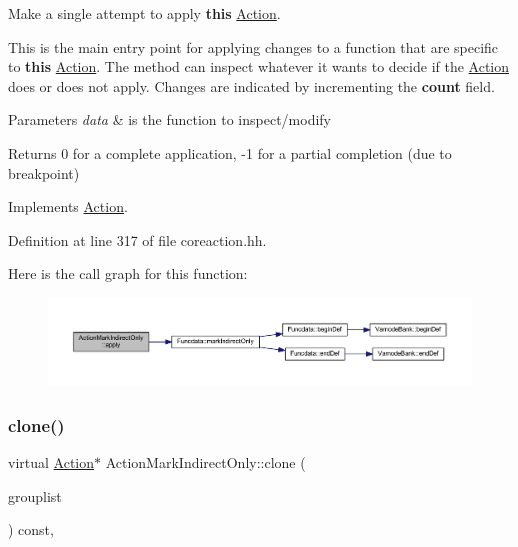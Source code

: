 Make a single attempt to apply {\bfseries{this}} \mbox{\hyperlink{class_action}{Action}}. 

This is the main entry point for applying changes to a function that are specific to {\bfseries{this}} \mbox{\hyperlink{class_action}{Action}}. The method can inspect whatever it wants to decide if the \mbox{\hyperlink{class_action}{Action}} does or does not apply. Changes are indicated by incrementing the {\bfseries{count}} field. 
\begin{DoxyParams}{Parameters}
{\em data} & is the function to inspect/modify \\
\hline
\end{DoxyParams}
\begin{DoxyReturn}{Returns}
0 for a complete application, -\/1 for a partial completion (due to breakpoint) 
\end{DoxyReturn}


Implements \mbox{\hyperlink{class_action_aac1c3999d6c685b15f5d9765a4d04173}{Action}}.



Definition at line 317 of file coreaction.\+hh.

Here is the call graph for this function\+:
\nopagebreak
\begin{figure}[H]
\begin{center}
\leavevmode
\includegraphics[width=350pt]{class_action_mark_indirect_only_aebf60dbaf803f470c8954cab93acc241_cgraph}
\end{center}
\end{figure}
\mbox{\label{class_action_mark_indirect_only_ac53f9107d3a9c5be4576867c9eb8ad01}} 
\subsubsection{\texorpdfstring{clone()}{clone()}}
{\footnotesize\ttfamily virtual \mbox{\hyperlink{class_action}{Action}}$\ast$ Action\+Mark\+Indirect\+Only\+::clone (\begin{DoxyParamCaption}\item[{const \mbox{\hyperlink{class_action_group_list}{Action\+Group\+List}} \&}]{grouplist }\end{DoxyParamCaption}) const\hspace{0.3cm}{\ttfamily [inline]}, {\ttfamily [virtual]}}



